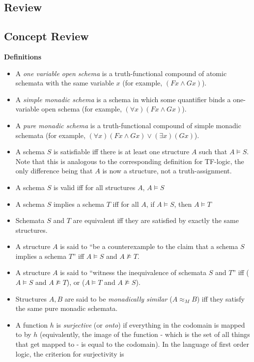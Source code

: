 \subsection{Review}
\begin{mdframed}[linewidth=1]
\section*{Concept Review}
\textbf{Definitions}
\begin{itemize}
    \item A \emph{one variable open schema} is a truth-functional compound of atomic schemata with the same variable $x$ (for example, $(Fx \land Gx)$). 
    \item A \emph{simple monadic schema} is a schema in which some quantifier binds a one-variable open schema (for example, $(\forall x)(Fx \land Gx)$). 
    \item A \emph{pure monadic schema} is a truth-functional compound of simple monadic schemata (for example, $(\forall x)(Fx \land Gx) \vee (\exists x)(Gx)$).
    \item A schema $S$ is satisfiable iff there is at least one structure $A$ such that $A \models S$. Note that this is analogous to the corresponding definition for TF-logic, the only difference being that $A$ is now a structure, not a truth-assignment. 
    \item A schema $S$ is valid iff for all structures $A$, $A \models S$
    \item A schema $S$ implies a schema $T$ iff for all $A$, if $A \models S$, then $A \models T$
    \item Schemata $S$ and $T$ are equivalent iff they are satisfied by exactly the same structures. 
    \item A structure $A$ is said to ``be a counterexample to the claim that a schema $S$ implies a schema $T$'' iff $A \models S$ and $A \not \models T$. 
    \item A structure $A$ is said to ``witness the inequivalence of schemata $S$ and $T$'' iff ($A \models S$ and $A \not \models T$), or ($A \models T$ and $A \not \models S$). 
    \item Structures $A, B$ are said to be \emph{monadically similar} ($A \approx_M B$) iff they satisfy the same pure monadic schemata. 
    \item A function $h$ is \emph{surjective} (or \emph{onto})  if everything in the codomain is mapped to by $h$ (equivalently, the image of the function - which is the set of all things that get mapped to - is equal to the codomain). In the language of first order logic, the criterion for surjectivity is

\end{itemize}
\end{mdframed}
